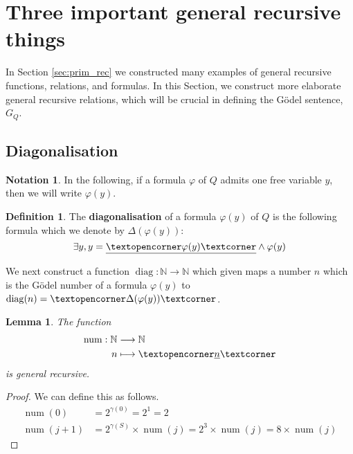 \documentclass[12pt]{article}
\theoremstyle{plain}
\newtheorem{lemma}[thm]{Lemma}
\theoremstyle{definition}
\newtheorem{defn}[thm]{Definition} %
\newtheorem{notation}[thm]{Notation}
\newcommand{\bb}[1]{\mathbb{#1}}
\newcommand{\adj}[1]{\text{\textopencorner}{#1}\text{\textcorner}}
\newcommand{\lto}{\longrightarrow}
\begin{document}
	\section{Three important general recursive things}\label{sec:crucial}
	In Section \ref{sec:prim_rec} we constructed many examples of general recursive functions, relations, and formulas. In this Section, we construct more elaborate general recursive relations, which will be crucial in defining the G\"{o}del sentence, $G_Q$.
	
	\subsection{Diagonalisation}
	\begin{notation}
		In the following, if a formula $\varphi$ of $Q$ admits one free variable $y$, then we will write $\varphi(y)$.
	\end{notation}
	\begin{defn}
		The \textbf{diagonalisation} of a formula $\varphi(y)$ of $Q$ is the following formula which we denote by $\Delta(\varphi(y))$:
		\begin{equation}
			\exists y, y = \underline{\adj{\varphi(y)}} \wedge \varphi(y)
		\end{equation}
	\end{defn}
	We next construct a function $\operatorname{diag}: \bb{N} \lto \bb{N}$ which given maps a number $n$ which is the G\"{o}del number of a formula $\varphi(y)$ to $\operatorname{diag}(n) = \adj{\Delta(\varphi(y))}$.
	
	\begin{lemma}
		The function
		\begin{align*}
			\operatorname{num}: \bb{N} &\lto \bb{N}\\
			n &\longmapsto \adj{\underline{n}}
		\end{align*}
		is general recursive.
	\end{lemma}
	\begin{proof}
		We can define this as follows.
		\begin{align*}
			\operatorname{num}(0) &= 2^{\gamma(0)} = 2^1 = 2\\
			\operatorname{num}(j+1) &= 2^{\gamma(S)}\times \operatorname{num}(j) = 2^3\times \operatorname{num}(j) = 8 \times \operatorname{num}(j)
		\end{align*}
	\end{proof}
	
\end{document}
